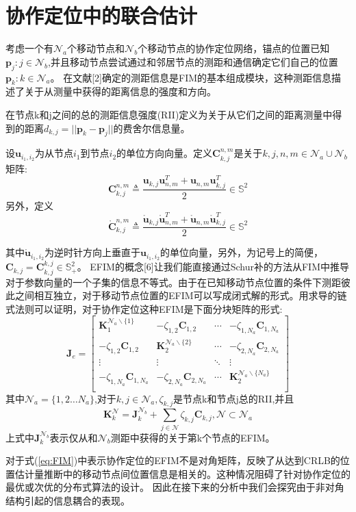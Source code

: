 \section{协作定位中的联合估计}
考虑一个有$\mathcal{N}_a$个移动节点和$\mathcal{N}_b$个移动节点的协作定位网络，锚点的位置已知${\bm{p}_j:j \in \mathcal{N}_b}$,并且移动节点尝试通过和邻居节点的测距和通信确定它们自己的位置${\bm{p}_k: k \in \mathcal{N}_a}$。
在文献[2]确定的测距信息是FIM的基本组成模块，这种测距信息描述了关于从测量中获得的距离信息的强度和方向。
\begin{definition}
在节点k和j之间的总的测距信息强度(RII)定义为关于从它们之间的距离测量中得到的距离$d_{k,j}=||\bm{p}_k-\bm{p}_j||$的费舍尔信息量。
\end{definition}
\begin{definition}
设$\bm{u}_{i_1,i_2}$为从节点$i_1$到节点$i_2$的单位方向向量。定义$\bm{C}^{n,m}_{k,j}$是关于$k,j,n,m \in \mathcal{N}_a \cup \mathcal{N}_b$矩阵:
\[
\bm{C}^{n,m}_{k,j} \triangleq \frac{\bm{u}_{k,j}\bm{u}_{n,m}^T+\bm{u}_{n,m}\bm{u}_{k,j}^T}{2} \in \mathbb{S}^2
\]
另外，定义
\[
\mathring{\bm{C}}^{n,m}_{k,j} \triangleq \frac{\mathring{\bm{u}}_{k,j}\mathring{\bm{u}}_{n,m}^T+\mathring{\bm{u}}_{n,m}\mathring{\bm{u}}_{k,j}^T}{2} \in \mathbb{S}^2
\]
\end{definition}

其中$\mathring{\bm{u}}_{i_1,i_2}$为逆时针方向上垂直于$\bm{u}_{i_1,i_2}$的单位向量，另外，为记号上的简便，$\bm{C}_{k,j}=\bm{C}^{k,j}_{k,j} \in \mathbb{S}^2_+$。
EFIM的概念[6]让我们能直接通过Schur补的方法从FIM中推导对于参数向量的一个子集的信息不等式。由于在已知移动节点位置的条件下测距彼此之间相互独立，对于移动节点位置的EFIM可以写成闭式解的形式。用求导的链式法则可以证明，对于协作定位这种EFIM是下面分块矩阵的形式:
\begin{equation}\label{eq:FIM}
\bm{J}_e=\left[\begin{array}{cccc}
\bm{K}_1^{\mathcal{N}_a \backslash \{1\}} & -\zeta_{1,2} \bm{C}_{1,2} &\cdots & -\zeta_{1,N_a} \bm{C}_{1,N_a} \\
-\zeta_{1,2} \bm{C}_{1,2} &\bm{K}_2^{\mathcal{N}_a \backslash \{2\}} & \cdots & -\zeta_{2,N_a} \bm{C}_{2,N_a} \\
\vdots & \vdots & \ddots & \vdots\\
-\zeta_{1,N_a} \bm{C}_{1,N_a} & -\zeta_{2,N_a} \bm{C}_{2,N_a} & \cdots & \bm{K}_2^{\mathcal{N}_a \backslash \{N_a\}}\\
\end{array}
\right]
\end{equation}
其中$\mathcal{N}_a=\{1,2 \dotsc N_a\}$,对于$k,j \in \mathcal{N}_a,\zeta_{k,j}$是节点k和节点j总的RII,并且
\[
\bm{K}^{\mathcal{N}}_k=\bm{J}^{\mathcal{N}_b}_k+\sum_{j\in \mathcal{N}} \zeta_{k,j} \bm{C}_{k,j}, \mathcal{N} \subset \mathcal{N}_a
\]
上式中$\bm{J}^{\mathcal{N}_b}_k$表示仅从和$\mathcal{N}_b$测距中获得的关于第k个节点的EFIM。
\begin{remark}
对于式(\ref{eq:FIM})中表示协作定位的EFIM不是对角矩阵，反映了从达到CRLB的位置估计量推断中的移动节点间位置信息是相关的。这种情况阻碍了针对协作定位的最优或次优的分布式算法的设计。%
因此在接下来的分析中我们会探究由于非对角结构引起的信息耦合的表现。
\end{remark}
